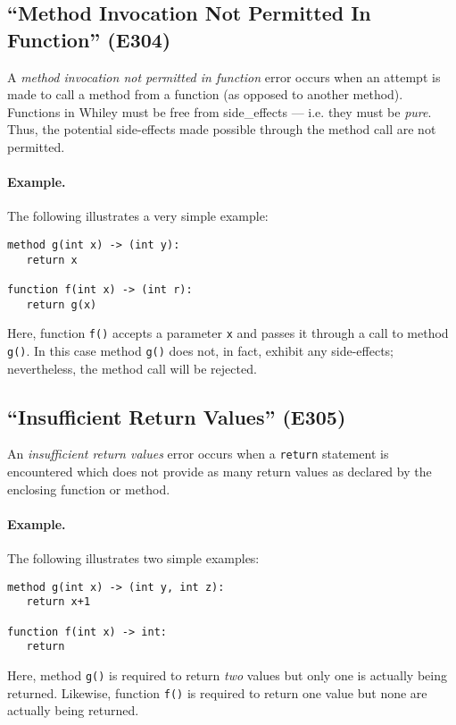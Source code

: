\subsection{``Method Invocation Not Permitted In Function'' (E304)}

A {\em method invocation not permitted in function} error occurs when an attempt is made to call a method from a function (as opposed to another method).  Functions in Whiley must be free from \glspl{side_effect} --- i.e. they must be {\em pure}.  Thus, the potential side-effects made possible through the method call are not permitted.

\paragraph{Example.}  The following illustrates a very simple example:

\begin{lstlisting}
method g(int x) -> (int y):
   return x

function f(int x) -> (int r):
   return g(x)
\end{lstlisting}

Here, function \lstinline{f()} accepts a parameter \lstinline{x} and passes it through a call to method \lstinline{g()}.  In this case method \lstinline{g()} does not, in fact, exhibit any side-effects; nevertheless, the method call will be rejected.

\subsection{``Insufficient Return Values'' (E305)}
An {\em insufficient return values} error occurs when a \lstinline{return} statement is encountered which does not provide as many return values as declared by the enclosing function or method.  

\paragraph{Example.}  The following illustrates two simple examples:

\begin{lstlisting}
method g(int x) -> (int y, int z):
   return x+1

function f(int x) -> int:
   return
\end{lstlisting}

Here, method \lstinline{g()} is required to return {\em two} values but only one is actually being returned.  Likewise, function \lstinline{f()} is required to return one value but none are actually being returned.

